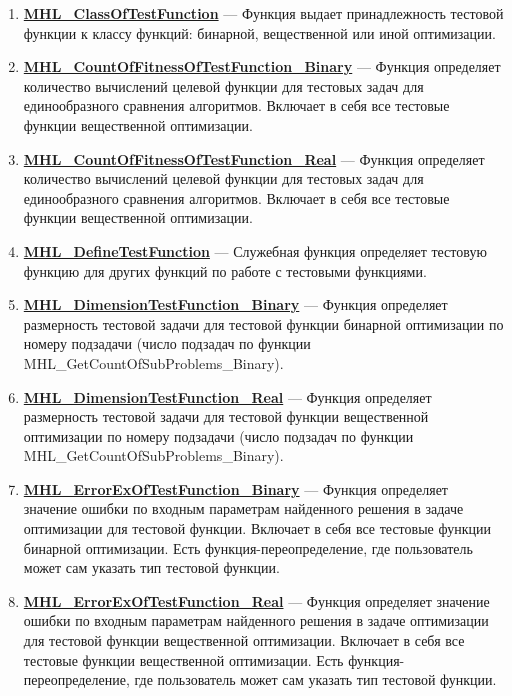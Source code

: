 \documentclass[a4paper,12pt]{article}
\begin{document}
\begin{enumerate}

\item \textbf{\hyperref[MHL_ClassOfTestFunction]{MHL\_ClassOfTestFunction}} --- Функция выдает принадлежность тестовой функции к классу функций: бинарной, вещественной или иной оптимизации.

\item \textbf{\hyperref[MHL_CountOfFitnessOfTestFunction_Binary]{MHL\_CountOfFitnessOfTestFunction\_Binary}} --- Функция определяет количество вычислений целевой функции для тестовых задач для единообразного сравнения алгоритмов. Включает в себя все тестовые функции вещественной оптимизации.

\item \textbf{\hyperref[MHL_CountOfFitnessOfTestFunction_Real]{MHL\_CountOfFitnessOfTestFunction\_Real}} --- Функция определяет количество вычислений целевой функции для тестовых задач для единообразного сравнения алгоритмов. Включает в себя все тестовые функции вещественной оптимизации.

\item \textbf{\hyperref[MHL_DefineTestFunction]{MHL\_DefineTestFunction}} --- Служебная функция определяет тестовую функцию для других функций по работе с тестовыми функциями.

\item \textbf{\hyperref[MHL_DimensionTestFunction_Binary]{MHL\_DimensionTestFunction\_Binary}} --- Функция определяет размерность тестовой задачи для тестовой функции бинарной оптимизации по номеру подзадачи (число подзадач по функции MHL\_GetCountOfSubProblems\_Binary).

\item \textbf{\hyperref[MHL_DimensionTestFunction_Real]{MHL\_DimensionTestFunction\_Real}} --- Функция определяет размерность тестовой задачи для тестовой функции вещественной оптимизации по номеру подзадачи (число подзадач по функции MHL\_GetCountOfSubProblems\_Binary).

\item \textbf{\hyperref[MHL_ErrorExOfTestFunction_Binary]{MHL\_ErrorExOfTestFunction\_Binary}} --- Функция определяет значение ошибки по входным параметрам найденного решения в задаче оптимизации для тестовой функции. Включает в себя все тестовые функции бинарной оптимизации. Есть функция-переопределение, где пользователь может сам указать тип тестовой функции.

\item \textbf{\hyperref[MHL_ErrorExOfTestFunction_Real]{MHL\_ErrorExOfTestFunction\_Real}} --- Функция определяет значение ошибки по входным параметрам найденного решения в задаче оптимизации для тестовой функции вещественной оптимизации. Включает в себя все тестовые функции вещественной оптимизации. Есть функция-переопределение, где пользователь может сам указать тип тестовой функции.


\end{enumerate}
\end{document}
